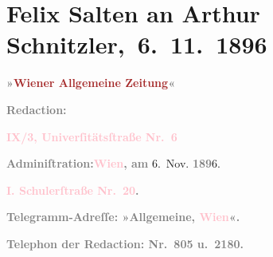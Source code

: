 

\renewcommand{\erwaehntePersonen}{Personen: Georg Hirschfeld}
\renewcommand{\erwaehnteInstitutionen}{Institutionen: Wiener Allgemeine Zeitung}
\renewcommand{\erwaehnteOrte}{Orte: Berlin, Schulerstraße, Universitätsstraße, Wien}
\renewcommand{\erwaehnteWerke}{Werke: Die Mütter. Schauspiel in vier Acten, Freiwild. Schauspiel in 3 Akten}
\section[ Felix Salten an Arthur Schnitzler, 6. 11. 1896]{Felix Salten an Arthur Schnitzler, 6. 11. 1896}
\nopagebreak{}
\rehead{ }\normalsize\beginnumbering{}
\toendnotes[C]{\smallbreak\pagebreak[2]}
\toendnotes[C]{\smallbreak}
\pstart
           \noindent{}{\pb}\textcolor{gray}{\textbf{\textbf{»\textcolor{brown}{Wiener Allgemeine
                        Zeitung}{}\ledrightnote{\textcolor{brown}{Wiener Allgemeine Zeitung}}«}}}\pend
           
\pstart
           \textcolor{gray}{\textbf{Redaction:}}\pend
           
\pstart
           \textcolor{gray}{\textbf{\textbf{\textcolor{pink}{IX/3, Univerſitätsſtraße Nr. 6}{}\ledrightnote{\textcolor{pink}{Universitätsstraße}}}}}\pend
           
\pstart
           \textcolor{gray}{\textbf{Adminiſtration:}}\hfill \textcolor{gray}{\textbf{\textcolor{pink}{Wien}{}\ledrightnote{\textcolor{pink}{Wien}}, am}}{ }6. Nov. \textcolor{gray}{\textbf{189}}6.\pend
           
\pstart
           \textcolor{gray}{\textbf{\textbf{\textcolor{pink}{I. Schulerſtraße Nr. 20}{}\ledrightnote{\textcolor{pink}{Schulerstraße}}. }}}\pend
           
\pstart
           \textcolor{gray}{\textbf{Telegramm-Adreſſe: »Allgemeine, \textcolor{pink}{Wien}{}\ledrightnote{\textcolor{pink}{Wien}}«.}}\pend
           
\pstart
           \textcolor{gray}{\textbf{Telephon der Redaction: Nr. 805 u. 2180.}}\pend
           
